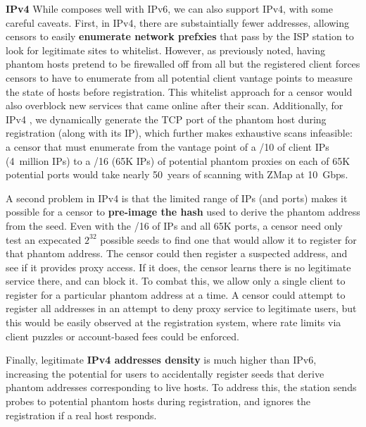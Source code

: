 \documentclass[sigconf]{acmart}
\renewcommand{\paragraph}[1]{\smallskip\noindent\textbf{#1\quad}}
\begin{document}
\paragraph{IPv4}
While \scheme composes well with IPv6, we can also support IPv4, with some
careful caveats. First, in IPv4, there are substaintially fewer addresses,
allowing censors to easily \textbf{enumerate network prefxies} that pass by the ISP
station to look for legitimate sites to whitelist. However, as previously noted,
having phantom hosts pretend to be firewalled off from all but the registered
client forces censors to have to enumerate from all potential client vantage
points to measure the state of hosts before registration. This whitelist
approach for a censor would also overblock new services that came online after
their scan.
Additionally, for IPv4 \scheme, we dynamically generate the TCP port of the phantom host
during registration (along with its IP), which further makes exhaustive scans infeasible:
a censor that must enumerate from the vantage point of a /10 of client IPs (4~million IPs)
to a /16 (65K IPs) of potential phantom proxies on each of 65K potential ports would take nearly
50~years of scanning with ZMap at 10~Gbps.

A second problem in IPv4 \scheme is that the limited range of IPs (and ports)
makes it possible for a censor to \textbf{pre-image the hash} used to derive the phantom
address from the seed. Even with the /16 of IPs and all 65K ports, a censor need
only test an expecated $2^{32}$ possible seeds to find one that would allow it
to register for that phantom address. The censor could then register a suspected
address, and see if it provides proxy access. If it does, the censor learns
there is no legitimate service there, and can block it. To combat this, we
allow only a single client to register for a particular phantom address at a
time. A censor could attempt to register all addresses in an attempt to deny
proxy service to legitimate users, but this would be easily observed at the
registration system, where rate limits via client puzzles or account-based fees
could be enforced.

Finally, legitimate \textbf{IPv4 addresses density} is much higher than IPv6,
increasing the potential for users to accidentally register seeds that derive
phantom addresses corresponding to live hosts. To address this, the station
sends probes to potential phantom hosts during registration, and ignores the
registration if a real host responds.
\end{document}
